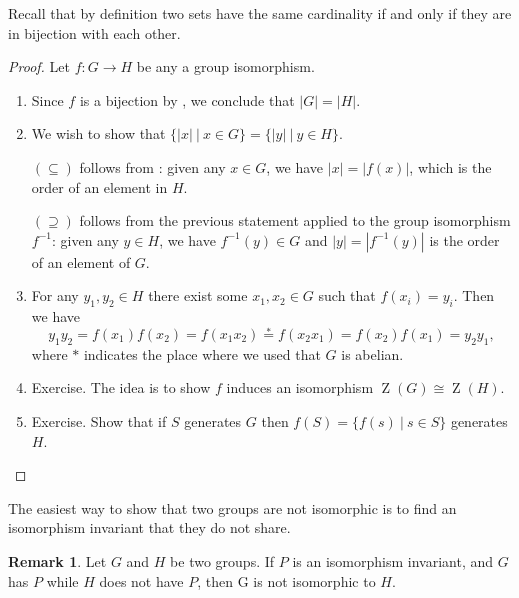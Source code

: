 \documentclass[12pt]{report}
\numberwithin{equation}{section}
\numberwithin{theorem}{chapter}
\theoremstyle{definition}
\newtheorem*{basic properties}{Basic Properties}
\newtheorem*{Important Remark}{Important Remark}
\newtheorem{remark}[theorem]{Remark}
\DeclareMathOperator{\Zc}{Z}
\begin{document}
Recall that by definition two sets have the same cardinality if and only if they are in bijection with each other.


\begin{proof}
Let $f\!:G\to H$ be any a group isomorphism.

\begin{enumerate}[leftmargin=20pt,label=(\alph*)]
\item Since $f$ is a bijection by , we conclude that $|G|=|H|$.

\item We wish to show that $\{|x| \ | \ x\in G\}= \{|y| \ | \ y\in H\}$. 

$(\subseteq)$ follows from : given any $x\in G$, we have $|x| = |f(x)|$, which is the order of an element in $H$.

$(\supseteq)$ follows from the previous statement applied to the group isomorphism $f^{-1}$: given any $y\in H$, we have $f^{-1}(y)\in G$ and $|y| = |f^{-1}(y)|$ is the order of an element of $G$.

\item For any $y_1,y_2\in H$ there exist some $x_1, x_2\in G$ such that $f(x_i)=y_i$. Then we have
$$y_1y_2=f(x_1)f(x_2)=f(x_1x_2)\stackrel{*}{=}f(x_2x_1)=f(x_2)f(x_1)=y_2y_1,$$
where $*$ indicates the place where we used that $G$ is abelian.
\item Exercise. The idea is to show $f$ induces an isomorphism $\Zc(G)\cong \Zc(H)$.
\item Exercise. Show that if $S$ generates $G$ then $f(S)=\{f(s) \ | \ s\in S\}$ generates $H$.\qedhere
\end{enumerate}
\end{proof}


The easiest way to show that two groups are not isomorphic is to find an isomorphism invariant that they do not share.

\begin{remark}
	Let $G$ and $H$ be two groups. If $P$ is an isomorphism invariant, and $G$ has $P$ while $H$ does not have $P$, then G is not isomorphic to $H$.
\end{remark}
\end{document}
